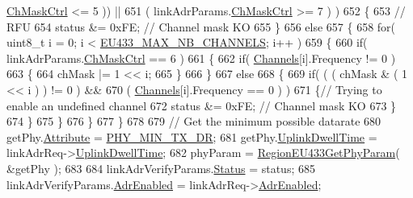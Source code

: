 \begin{DoxyCode}
      \mbox{\hyperlink{structs_region_common_link_adr_params_ac5e1891f30a172b2ce39bc3498e1843d}{ChMaskCtrl}} <= 5 )) ||
651                 ( linkAdrParams.\mbox{\hyperlink{structs_region_common_link_adr_params_ac5e1891f30a172b2ce39bc3498e1843d}{ChMaskCtrl}} >= 7 ) )
652         \{
653             \textcolor{comment}{// RFU}
654             status &= 0xFE; \textcolor{comment}{// Channel mask KO}
655         \}
656         \textcolor{keywordflow}{else}
657         \{
658             \textcolor{keywordflow}{for}( uint8\_t i = 0; i < \mbox{\hyperlink{group___r_e_g_i_o_n_e_u433_ga800fbd07b871c93758364a0311b87937}{EU433\_MAX\_NB\_CHANNELS}}; i++ )
659             \{
660                 \textcolor{keywordflow}{if}( linkAdrParams.\mbox{\hyperlink{structs_region_common_link_adr_params_ac5e1891f30a172b2ce39bc3498e1843d}{ChMaskCtrl}} == 6 )
661                 \{
662                     \textcolor{keywordflow}{if}( \mbox{\hyperlink{_region_e_u433_8c_a989ac3355f1ed5b534b3940af3deeb14}{Channels}}[i].Frequency != 0 )
663                     \{
664                         chMask |= 1 << i;
665                     \}
666                 \}
667                 \textcolor{keywordflow}{else}
668                 \{
669                     \textcolor{keywordflow}{if}( ( ( chMask & ( 1 << i ) ) != 0 ) &&
670                         ( \mbox{\hyperlink{_region_e_u433_8c_a989ac3355f1ed5b534b3940af3deeb14}{Channels}}[i].Frequency == 0 ) )
671                     \{\textcolor{comment}{// Trying to enable an undefined channel}
672                         status &= 0xFE; \textcolor{comment}{// Channel mask KO}
673                     \}
674                 \}
675             \}
676         \}
677     \}
678 
679         \textcolor{comment}{// Get the minimum possible datarate}
680     getPhy.\mbox{\hyperlink{structs_get_phy_params_abdcb168ffd6913b85e2f635d7a475f2d}{Attribute}} = \mbox{\hyperlink{group___r_e_g_i_o_n_gga51cbe8f5433d914fe9cf81b451de2c2daace3e56c88b40def8ed6a9106871e7de}{PHY\_MIN\_TX\_DR}};
681     getPhy.\mbox{\hyperlink{structs_get_phy_params_a0e6663762d6f9173bc8d8cb018f8f17a}{UplinkDwellTime}} = linkAdrReq->\mbox{\hyperlink{structs_link_adr_req_params_a0e6663762d6f9173bc8d8cb018f8f17a}{UplinkDwellTime}};
682     phyParam = \mbox{\hyperlink{group___r_e_g_i_o_n_e_u433_ga407d34fe6c7dea18b07732d03b62894b}{RegionEU433GetPhyParam}}( &getPhy );
683 
684     linkAdrVerifyParams.\mbox{\hyperlink{structs_region_common_link_adr_req_verify_params_a7ca418fa247ab5f1df4e8b5852d8b738}{Status}} = status;
685     linkAdrVerifyParams.\mbox{\hyperlink{structs_region_common_link_adr_req_verify_params_ab3e2fb44577c95786e11aacd56769703}{AdrEnabled}} = linkAdrReq->\mbox{\hyperlink{structs_link_adr_req_params_ab3e2fb44577c95786e11aacd56769703}{AdrEnabled}};

\end{DoxyCode}

